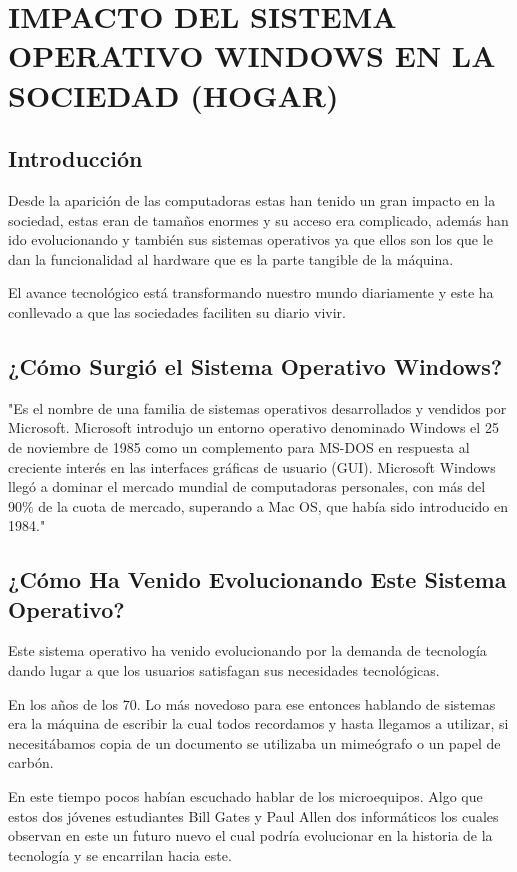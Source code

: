\chapter*{IMPACTO DEL SISTEMA OPERATIVO WINDOWS EN LA SOCIEDAD (HOGAR)}
\section*{Introducción}
Desde la aparición de las computadoras estas han tenido un gran impacto en la sociedad, estas eran de tamaños enormes y su acceso era complicado, además han ido 
evolucionando y también sus sistemas operativos ya que ellos son los que le dan la funcionalidad al hardware que es la parte tangible de la máquina.

El avance tecnológico está transformando nuestro mundo diariamente y este ha conllevado a que las sociedades faciliten su diario vivir.

\section*{¿Cómo Surgió el Sistema Operativo Windows?}
"Es el nombre de una familia de sistemas operativos desarrollados y vendidos por Microsoft. Microsoft introdujo un entorno operativo denominado Windows el 25 de noviembre 
de 1985 como un complemento para MS-DOS en respuesta al creciente interés en las interfaces gráficas de usuario (GUI). Microsoft Windows llegó a dominar el mercado mundial 
de computadoras personales, con más del 90\% de la cuota de mercado, superando a Mac OS, que había sido introducido en 1984."

\section*{¿Cómo Ha Venido Evolucionando Este Sistema Operativo?}
Este sistema operativo ha venido evolucionando por la demanda de tecnología dando lugar a que los usuarios satisfagan sus necesidades tecnológicas. 

En los años de los 70. Lo más novedoso para ese entonces hablando de sistemas era la máquina de escribir la cual todos recordamos y hasta llegamos a utilizar, si 
necesitábamos copia de un documento se utilizaba un mimeógrafo o un papel de carbón.

En este tiempo pocos habían escuchado hablar de los microequipos. Algo que estos dos jóvenes estudiantes Bill Gates y Paul Allen dos informáticos los cuales observan en 
este un futuro nuevo el cual podría evolucionar en la historia de la tecnología y se encarrilan hacia este.

